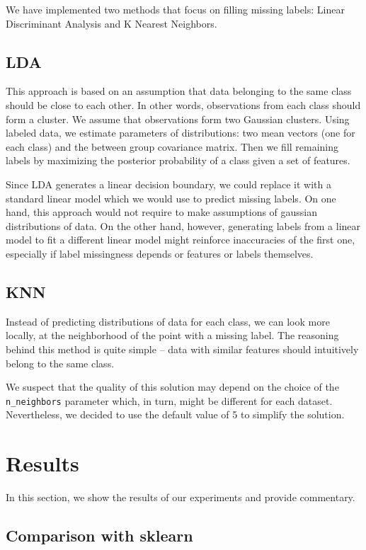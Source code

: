 \documentclass{article}
\begin{document}
We have implemented two methods that focus on filling missing labels: Linear Discriminant Analysis and K Nearest Neighbors.

\subsection{LDA}

This approach is based on an assumption that data belonging to the same class should be close to each other. In other words, observations from each class should form a cluster. We assume that observations form two Gaussian clusters. Using labeled data, we estimate parameters of distributions: two mean vectors (one for each class) and the between group covariance matrix. Then we fill remaining labels by maximizing the posterior probability of a class given a set of features.

Since LDA generates a linear decision boundary, we could replace it with a standard linear model which we would use to predict missing labels. On one hand, this approach would not require to make assumptions of gaussian distributions of data. On the other hand, however, generating labels from a linear model to fit a different linear model might reinforce inaccuracies of the first one, especially if label missingness depends or features or labels themselves.

\subsection{KNN}

Instead of predicting distributions of data for each class, we can look more locally, at the neighborhood of the point with a missing label. The reasoning behind this method is quite simple -- data with similar features should intuitively belong to the same class.

We suspect that the quality of this solution may depend on the choice of the \verb|n_neighbors| parameter which, in turn, might be different for each dataset. Nevertheless, we decided to use the default value of 5 to simplify the solution.

\section{Results}

In this section, we show the results of our experiments and provide commentary.

\subsection{Comparison with sklearn}
\end{document}
